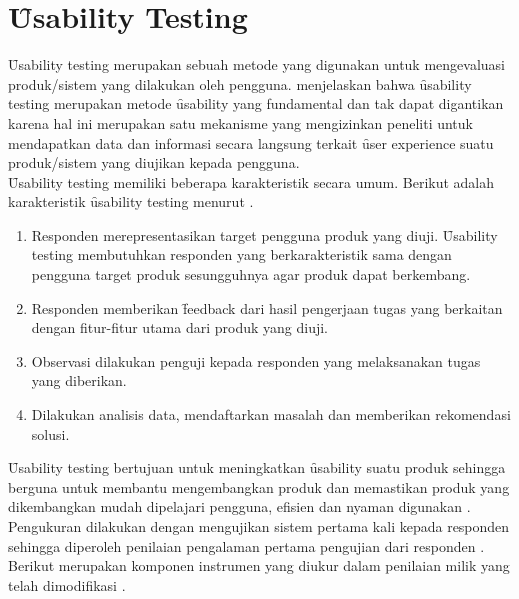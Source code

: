 \section{\f{Usability Testing}}\label{subsec:ust}
\f{Usability testing} merupakan sebuah metode yang digunakan untuk mengevaluasi produk/sistem yang dilakukan oleh pengguna. \citet{article.nielsen} menjelaskan bahwa \f{usability testing} merupakan metode \f{usability} yang fundamental dan tak dapat digantikan karena hal ini merupakan satu mekanisme yang mengizinkan peneliti untuk mendapatkan data dan informasi secara langsung terkait \f{user experience} suatu produk/sistem yang diujikan kepada pengguna.
\newline\\
\f{Usability testing} memiliki beberapa karakteristik secara umum. Berikut adalah karakteristik \f{usability} testing menurut \citet{buku.dumas}.
\begin{enumerate}
	\item Responden merepresentasikan target pengguna produk yang diuji. \f{Usability testing} membutuhkan responden yang berkarakteristik sama dengan pengguna target produk sesungguhnya agar produk dapat berkembang. 
	\item Responden memberikan \f{feedback} dari hasil pengerjaan tugas yang berkaitan dengan fitur-fitur utama dari produk yang diuji.
	\item Observasi dilakukan penguji kepada responden yang melaksanakan tugas yang diberikan.
	\item Dilakukan analisis data, mendaftarkan masalah dan memberikan rekomendasi solusi.
\end{enumerate}
\f{Usability testing} bertujuan untuk meningkatkan \f{usability} suatu produk sehingga berguna untuk membantu mengembangkan produk dan memastikan produk yang dikembangkan mudah dipelajari pengguna, efisien dan nyaman digunakan \citep{buku.rubin}.
\newline\\
Pengukuran \ust \space dilakukan dengan mengujikan sistem pertama kali kepada responden sehingga diperoleh penilaian pengalaman pertama pengujian dari responden \citep{buku.rubin}. Berikut merupakan komponen instrumen yang diukur dalam penilaian \ust \space milik \citeauthor{article.nielsen2} yang telah dimodifikasi \citep{paper.alotaibi}.
